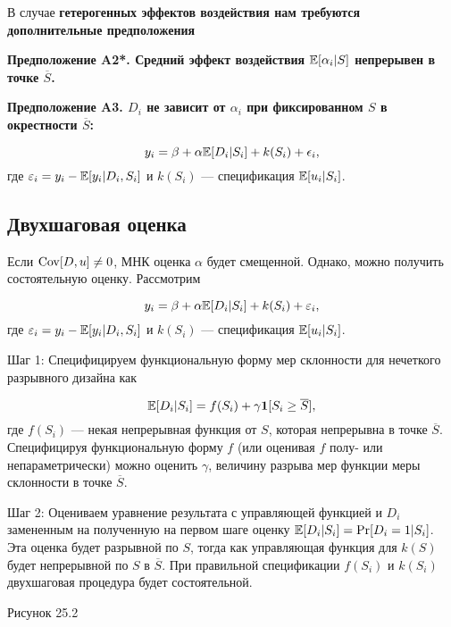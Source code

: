 В случае \bfseries гетерогенных эффектов воздействия \mdseries нам требуются дополнительные предположения

\bfseries Предположение A2*. \mdseries Средний эффект воздействия $\mathbb{E} [\alpha_i | S]$ непрерывен в точке $\overline{S}$.

\bfseries Предположение A3. \mdseries $D_i$ не зависит от $\alpha_i$ при фиксированном $S$ в окрестности $\overline{S}$:

\begin{equation}
\label{eq25.61}
y_i = \beta + \alpha \mathbb{E}[D_i|S_i] + k (S_i) + \epsilon_i,
\end{equation}
где $\varepsilon_i = y_i - \mathbb{E} [y_i | D_i , S_i ] $ и $k(S_i)$ --- спецификация $\mathbb{E} [u_i | S_i ]$. 

\subsection{Двухшаговая оценка}

Если $\mathrm{Cov} [D,u] \ne 0$, МНК оценка $\alpha$ будет смещенной. Однако, можно получить состоятельную оценку. Рассмотрим

\begin{equation}
\label{eq25.62}
y_i = \beta + \alpha \mathbb{E}[D_i|S_i] + k (S_i) + \varepsilon_i,
\end{equation}
где $\varepsilon_i = y_i - \mathbb{E} [y_i | D_i , S_i ] $ и $k(S_i)$ --- спецификация $\mathbb{E} [u_i | S_i ]$. 

Шаг 1: Специфицируем функциональную форму мер склонности для нечеткого разрывного дизайна как

\begin{equation}
\label{eq25.63}
\mathbb{E} [D_i | S_i] = f (S_i) + \gamma \boldsymbol{1} [S_i \ge \overline{S}],
\end{equation}
где $f (S_i)$ --- некая непрерывная функция от $S$, которая непрерывна в точке $\overline{S}$. Специфицируя функциональную форму $f$ (или оценивая $f$ полу- или непараметрически) можно оценить $\gamma$, величину разрыва мер функции меры склонности в точке $\overline{S}$. 

Шаг 2: Оцениваем уравнение результата с управляющей функцией и $D_i$ замененным на полученную на первом шаге оценку $\mathbb{E} [D_i | S_i ] = \mathrm{Pr} [D_i = 1 | S_i]$. Эта оценка будет разрывной по $S$, тогда как управляющая функция для $k(S)$ будет непрерывной по $S$ в $\overline{S}$. При правильной спецификации $f(S_i)$ и $k(S_i)$ двухшаговая процедура будет состоятельной. 

\vspace{3cm}
Рисунок 25.2


